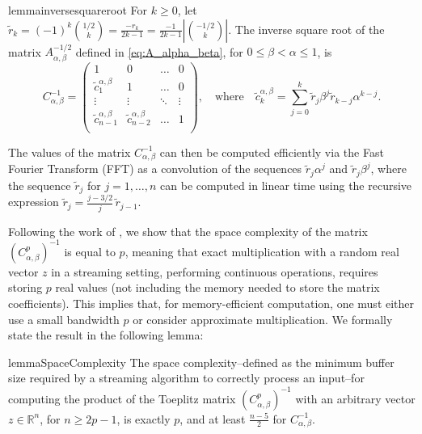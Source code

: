 \documentclass{article} %
\begin{document}
\begin{restatable}{lemma}{inversesquareroot}
\label{lem:inv_sqrt_A_alpha_beta}
For $k\geq 0$, let $\tilde{r}_k = (-1)^k \binom{1/2}{k} = \frac{-r_k}{2k - 1} = \frac{-1}{2k - 1}\left|\binom{-1/2}{k}\right|.$ The inverse square root of the matrix $A_{\alpha, \beta}^{-1/2}$ defined in \eqref{eq:A_alpha_beta}, for $0 \le \beta < \alpha \le 1$, is
\begin{equation}
C_{\alpha, \beta}^{-1} =
\begin{pmatrix}
1 & 0 & \dots & 0 \\
\tilde{c}^{\alpha, \beta}_1 & 1 & \dots & 0 \\
\vdots & \vdots & \ddots & \vdots \\
\tilde{c}^{\alpha, \beta}_{n - 1} & \tilde{c}^{\alpha, \beta}_{n - 2} & \dots & 1 \\
\end{pmatrix}, \quad \text{where} \quad \tilde{c}^{\alpha, \beta}_{k} = \sum\limits_{j = 0}^{k} \tilde{r}_j \beta^j \tilde{r}_{k - j}\alpha^{k - j}.
\label{eq:C_inv_sqrt}
\end{equation}
\end{restatable}
%
The values of the matrix $C_{\alpha, \beta}^{-1}$ can then be computed efficiently via the Fast Fourier Transform (FFT) as a convolution of the sequences $\tilde{r}_j \alpha^j$ and $\tilde{r}_j \beta^{j}$, where the sequence $\tilde{r}_j$ for $j = 1, \dots, n$ can be computed in linear time using the recursive expression $\tilde{r}_j = \tfrac{j - 3/2}{j} \, \tilde{r}_{j - 1}$.


Following the work of \citet{Andersson2025}, we show that the space complexity of the matrix $(C^p_{\alpha, \beta})^{-1}$ is equal to $p$, meaning that exact multiplication with a random real vector $z$ in a streaming setting, performing continuous operations, requires storing $p$ real values (not including the memory needed to store the matrix coefficients). This implies that, for memory-efficient computation, one must either use a small bandwidth $p$ or consider approximate multiplication. We formally state the result in the following lemma:

\begin{restatable}{lemma}{SpaceComplexity} 
\label{lem:space_complexity}
The space complexity--defined as the minimum buffer size required by a {streaming} algorithm to correctly process an input--for computing the product of the Toeplitz matrix $(C^{p}_{\alpha, \beta})^{-1}$ with an arbitrary vector $z \in \mathbb{R}^{n}$, for $n \ge 2p - 1$, is exactly $p$, and at least $\frac{n - 5}{2}$ for $C_{\alpha, \beta}^{-1}$.
\end{restatable}
\end{document}
